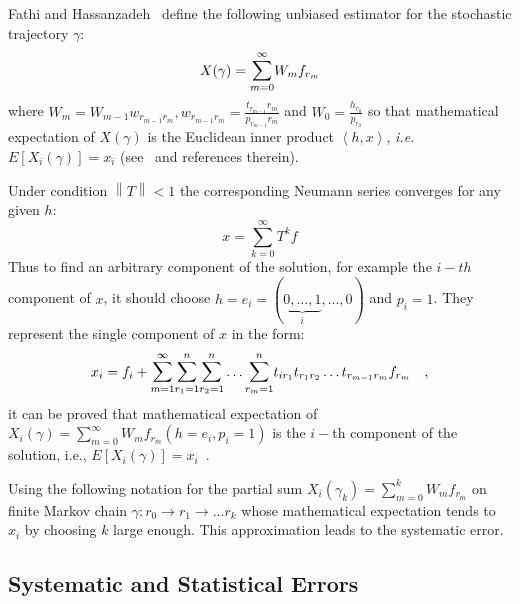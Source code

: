 \documentclass{juliacon}
\begin{document}
Fathi and Hassanzadeh~\cite{Fathi-Vajargah2018} define the following unbiased estimator for the stochastic trajectory $\gamma$:
\begin{equation}
\label{espx-4}
    X(\gamma) = \mathlarger \sum_{m = 0}^{\infty} W_mf_{r_m}
\end{equation}
where $W_m = W_{m-1}w_{r_{m-1}r_m}, w_{r_{m-1}r_m}=\frac{t_{r_{m-1}}r_m}{p_{r_{m-1}}r_m}$ and $W_0=\frac{h_{r_0}}{p_{r_0}}$ so that mathematical expectation of $X(\gamma)$ is the Euclidean inner product  $\left \langle h,x \right \rangle$, \textit{i.e.} $E[X_i(\gamma)]=x_i$ (see~\cite{dimov2015} and references therein).

Under condition $\left \| T \right \| < 1$ the corresponding Neumann series converges for any given $h$: 
\begin{equation}
 \label{newser-3}
  x = \sum_{k=0}^{\infty}T^kf 
\end{equation}
Thus to find an arbitrary component of the solution, for example the $i-th$ component of $x$, it should choose $h=e_i=(\underset{i}{\underbrace{0,...,1}},...,0)$ and $p_i=1$. They represent the single component of $x$ in the form:
\begin{equation}
 \label{sums-6}
 x_i = f_i + \mathlarger{\sum}_{m=1}^{\infty} \mathlarger{\sum}_{r_1 = 1}^{n} \mathlarger{\sum}_{r_2 = 1}^{n} \dots \mathlarger{\sum}_{r_m = 1}^{n} t_{ir_1} t_{r_1r_2} \dots t_{r_{m-1}r_m}f_{r_m} \quad ,
\end{equation}
it can be proved that mathematical expectation of $X_i(\gamma)=\sum_{m=0}^{\infty}W_mf_{r_m}(h=e_i, p_i=1)$ is the $i-$th component of the solution, i.e., $E[X_i(\gamma)]=x_i$~\cite{dimov2015}.

Using the following notation for the partial sum $X_i(\gamma_k)=\sum_{m=0}^{k}W_mf_{r_m}$ on finite Markov chain $\gamma : r_0 \rightarrow r_1 \rightarrow \dots r_k$ whose mathematical expectation tends to $x_i$ by choosing $k$ large enough. This approximation leads to the systematic error.

\subsection{Systematic and Statistical Errors}
\end{document}
